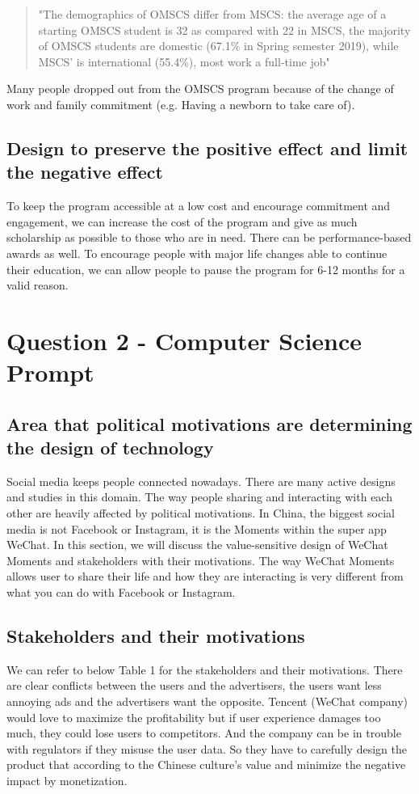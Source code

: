 \documentclass[
	letterpaper, %
]{jdf}
\begin{document}
\begin{quotation}
\noindent "The demographics of OMSCS differ from MSCS: the average age of a starting OMSCS student is 32 as compared with 22 in MSCS, the majority of OMSCS students are domestic (67.1\% in Spring semester 2019), while MSCS' is international (55.4\%), most work a full-time job"
\end{quotation}

Many people dropped out from the OMSCS program because of the change of work and family commitment (e.g. Having a newborn to take care of).

\subsection{Design to preserve the positive effect and limit the negative effect}
To keep the program accessible at a low cost and encourage commitment and engagement, we can increase the cost of the program and give as much scholarship as possible to those who are in need. There can be performance-based awards as well. To encourage people with major life changes able to continue their education, we can allow people to pause the program for 6-12 months for a valid reason. 

\section{Question 2 - Computer Science Prompt}
\subsection{Area that political motivations are determining the design of technology}


Social media keeps people connected nowadays. There are many active designs and studies in this domain. The way people sharing and interacting with each other are heavily affected by political motivations. In China, the biggest social media is not Facebook or Instagram, it is the Moments within the super app WeChat. In this section, we will discuss the value-sensitive design of WeChat Moments and stakeholders with their motivations. The way WeChat Moments allows user to share their life and how they are interacting is very different from what you can do with Facebook or Instagram. 

\subsection{Stakeholders and their motivations}
We can refer to below Table 1 for the stakeholders and their motivations. There are clear conflicts between the users and the advertisers, the users want less annoying ads and the advertisers want the opposite. Tencent (WeChat company) would love to maximize the profitability but if user experience damages too much, they could lose users to competitors. And the company can be in trouble with regulators if they misuse the user data. So they have to carefully design the product that according to the Chinese culture's value and minimize the negative impact by monetization.
\end{document}
